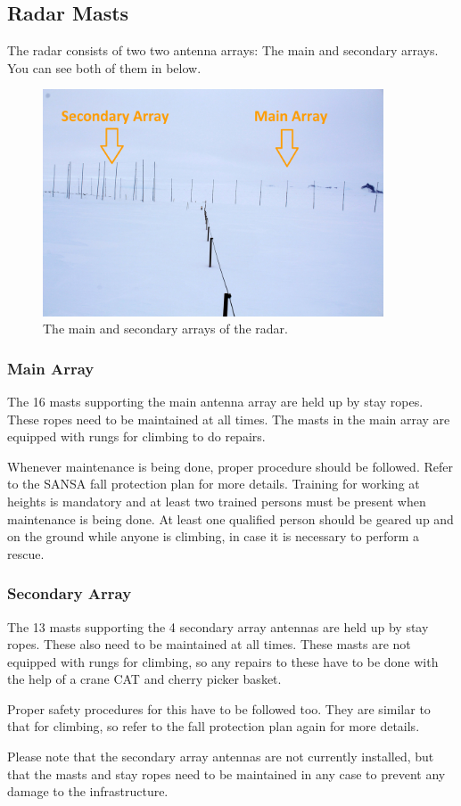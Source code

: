 \clearpage

\subsection{Radar Masts}
\label{subsec:infra_masts}
The radar consists of two two antenna arrays: The main and secondary arrays. You can see both of them in  below.
\begin{figure}[H]
	\centering
	\includegraphics[width=0.9\textwidth]{images/infrastructure/radar.jpg}
	\caption{The main and secondary arrays of the radar.}
	\label{fig:infra_radar}
\end{figure}

\subsubsection{Main Array}
The 16 masts supporting the main antenna array are held up by stay ropes. These ropes need to be maintained at all times. The masts in the main array are equipped with rungs for climbing to do repairs.
\par
Whenever maintenance is being done, proper procedure should be followed. Refer to the SANSA fall protection plan for more details. Training for working at heights is mandatory and at least two trained persons must be present when maintenance is being done. At least one qualified person should be geared up and on the ground while anyone is climbing, in case it is necessary to perform a rescue.

\subsubsection{Secondary Array}
The 13 masts supporting the 4 secondary array antennas are held up by stay ropes. These also need to be maintained at all times. These masts are not equipped with rungs for climbing, so any repairs to these have to be done with the help of a crane CAT and cherry picker basket.
\par
Proper safety procedures for this have to be followed too. They are similar to that for climbing, so refer to the fall protection plan again for more details.
\par
Please note that the secondary array antennas are not currently installed, but that the masts and stay ropes need to be maintained in any case to prevent any damage to the infrastructure.

\clearpage